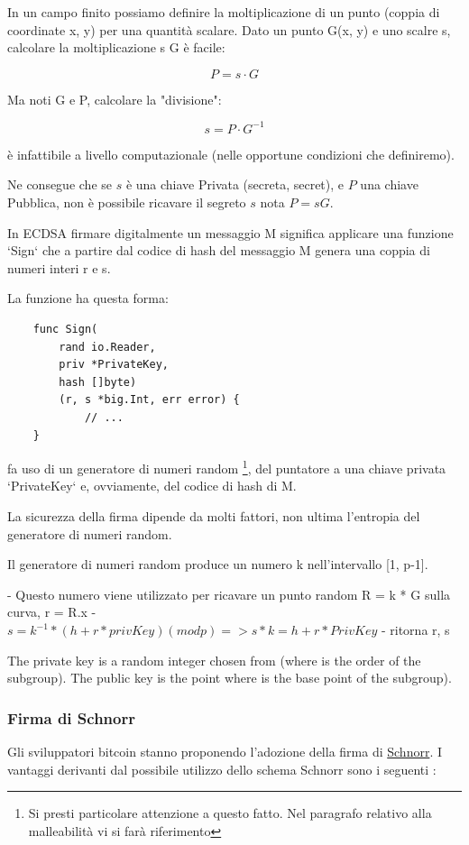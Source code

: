 \documentclass{book}
\theoremstyle{definition}
\begin{document}
In un campo finito possiamo definire la moltiplicazione di un punto (coppia di coordinate x, y) per una quantità scalare.
Dato un punto G(x, y) e uno scalre s, calcolare la moltiplicazione s G è facile:

\[
    P = s \cdot G
\]

Ma noti G e P, calcolare la "divisione":

\[
    s = P \cdot G^{-1}
\]

è infattibile a livello computazionale (nelle opportune condizioni che definiremo).

Ne consegue che se $s$ è una chiave Privata (secreta, secret), e $P$ una chiave Pubblica, non è possibile ricavare il segreto $s$ nota $P = s G$.

In ECDSA firmare digitalmente un messaggio M significa applicare una funzione `Sign` che a partire dal codice di hash del messaggio M genera una coppia di numeri interi r e s.

La funzione ha questa forma:

\begin{lstlisting}
    func Sign(
        rand io.Reader, 
        priv *PrivateKey, 
        hash []byte) 
        (r, s *big.Int, err error) {
            // ...
    }
\end{lstlisting}

fa uso di un generatore di numeri random 
\footnote{Si presti particolare attenzione a questo fatto. Nel paragrafo relativo alla malleabilità vi si farà riferimento}, 
del puntatore a una chiave privata `PrivateKey` e, ovviamente, del codice di hash di M.

La sicurezza della firma dipende da molti fattori, non ultima l'entropia del generatore di numeri random.

Il generatore di numeri random produce un numero k nell'intervallo [1, p-1].

- Questo numero viene utilizzato per ricavare un punto random R = k * G sulla curva, r = R.x
- $s = k^{-1} * (h + r * privKey) (mod p) => s * k = h + r * PrivKey$
- ritorna r, s

The private key is a random integer chosen from  (where  is the order of the subgroup).
The public key is the point where  is the base point of the subgroup).

\subsubsection{Firma di Schnorr} \label{Schnorr}

Gli sviluppatori bitcoin stanno proponendo l'adozione della firma di \href{https://en.bitcoin.it/wiki/Schnorr}{Schnorr}.
I vantaggi derivanti dal possibile utilizzo dello schema Schnorr sono i seguenti \cite{BipSchnorr}:
\end{document}
